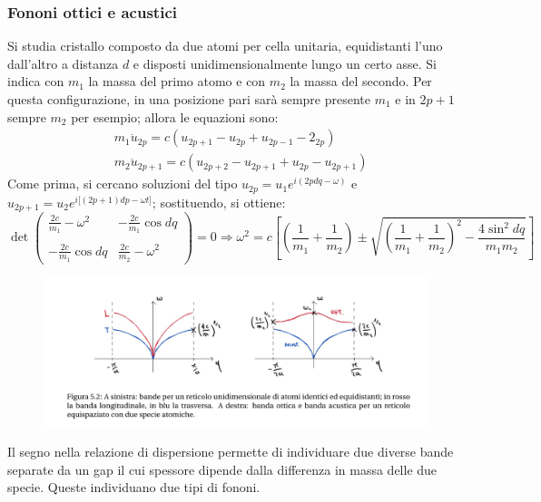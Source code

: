 \documentclass[10pt, a4paper]{scrartcl}
\numberwithin{equation}{subsection}
\theoremstyle{style1}
\theoremstyle{style2}
\begin{document}
\subsubsection{Fononi ottici e acustici}
	Si studia cristallo composto da due atomi per cella unitaria, equidistanti l'uno dall'altro a distanza $d$ e disposti unidimensionalmente lungo un certo asse.
	Si indica con $m_1$ la massa del primo atomo e con $m_2$ la massa del secondo.
	Per questa configurazione, in una posizione pari sar\`a sempre presente $m_1$ e in $2p+1$ sempre $m_2$ per esempio; allora le equazioni sono:
	\begin{equation}
		\begin{split}
			&m_1\ddot{u}_{2p} = c (u_{2p+1} - u_{2p} + u_{2p -1} -2_{2p} )\\
			& m_2 \ddot{u}_{2p+1} = c (u_{2p+2} -u_{2p+1} +u_{2p} - u_{2p+1} )
		\end{split}
	\end{equation}
Come prima, si cercano soluzioni del tipo $u_{2p}  = u_1 e^{i (2pdq - \omega )}$ e $u_{2p+1} = u_2 e^{i\big[(2p+1) dp - \omega t\big]} $; sostituendo, si ottiene:
\begin{equation}
	\det \begin{pmatrix}\displaystyle  \frac{2c}{m_1}- \omega^2 &\displaystyle  - \frac{2c}{m_1}\cos dq \\ & \\ \displaystyle -\frac{2c}{m_1}\cos dq &\displaystyle  \frac{2c}{m_2}-\omega ^2\end{pmatrix}  = 0 \Rightarrow  \omega ^2 = c \left[ \left(\frac{1}{m_1}+\frac{1}{m_2}\right) \pm\sqrt{ \left(\frac{1}{m_1}+\frac{1}{m_2}\right) ^2 - \frac{4 \sin^2dq}{m_1m_2}}  \right] 
\end{equation}
\begin{figure}[h!]
	\centering
	\includegraphics[width=1\columnwidth]{fon.png}
\end{figure}
Il segno nella relazione di dispersione permette di individuare due diverse bande separate da un gap il cui spessore dipende dalla differenza in massa delle due specie. Queste individuano due tipi di fononi.
\end{document}
